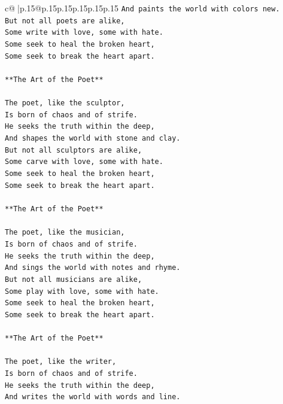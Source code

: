\documentclass{article}
\begin{document}
{\begin{supertabular}{c@{$\;$}|p{.15\linewidth}@{}p{.15\linewidth}p{.15\linewidth}p{.15\linewidth}p{.15\linewidth}p{.15\linewidth}}
{{{\texttt{And paints the world with colors new.} \\
\texttt{But not all poets are alike,} \\
\texttt{Some write with love, some with hate.} \\
\texttt{Some seek to heal the broken heart,} \\
\texttt{Some seek to break the heart apart.} \\
\\ 
\texttt{**The Art of the Poet**} \\
\\ 
\texttt{The poet, like the sculptor,} \\
\texttt{Is born of chaos and of strife.} \\
\texttt{He seeks the truth within the deep,} \\
\texttt{And shapes the world with stone and clay.} \\
\texttt{But not all sculptors are alike,} \\
\texttt{Some carve with love, some with hate.} \\
\texttt{Some seek to heal the broken heart,} \\
\texttt{Some seek to break the heart apart.} \\
\\ 
\texttt{**The Art of the Poet**} \\
\\ 
\texttt{The poet, like the musician,} \\
\texttt{Is born of chaos and of strife.} \\
\texttt{He seeks the truth within the deep,} \\
\texttt{And sings the world with notes and rhyme.} \\
\texttt{But not all musicians are alike,} \\
\texttt{Some play with love, some with hate.} \\
\texttt{Some seek to heal the broken heart,} \\
\texttt{Some seek to break the heart apart.} \\
\\ 
\texttt{**The Art of the Poet**} \\
\\ 
\texttt{The poet, like the writer,} \\
\texttt{Is born of chaos and of strife.} \\
\texttt{He seeks the truth within the deep,} \\
\texttt{And writes the world with words and line.} \\
}}}
\end{supertabular}}
\end{document}
